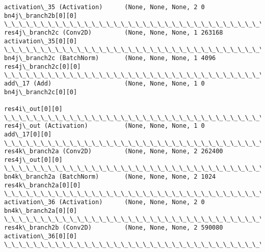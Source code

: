 \documentclass[11pt]{article}
\begin{document}
\begin{Verbatim}[commandchars=\\\{\}]
activation\_35 (Activation)      (None, None, None, 2 0           bn4j\_branch2b[0][0]              
\_\_\_\_\_\_\_\_\_\_\_\_\_\_\_\_\_\_\_\_\_\_\_\_\_\_\_\_\_\_\_\_\_\_\_\_\_\_\_\_\_\_\_\_\_\_\_\_\_\_\_\_\_\_\_\_\_\_\_\_\_\_\_\_\_\_\_\_\_\_\_\_\_\_\_\_\_\_\_\_\_\_\_\_\_\_\_\_\_\_\_\_\_\_\_\_\_\_
res4j\_branch2c (Conv2D)         (None, None, None, 1 263168      activation\_35[0][0]              
\_\_\_\_\_\_\_\_\_\_\_\_\_\_\_\_\_\_\_\_\_\_\_\_\_\_\_\_\_\_\_\_\_\_\_\_\_\_\_\_\_\_\_\_\_\_\_\_\_\_\_\_\_\_\_\_\_\_\_\_\_\_\_\_\_\_\_\_\_\_\_\_\_\_\_\_\_\_\_\_\_\_\_\_\_\_\_\_\_\_\_\_\_\_\_\_\_\_
bn4j\_branch2c (BatchNorm)       (None, None, None, 1 4096        res4j\_branch2c[0][0]             
\_\_\_\_\_\_\_\_\_\_\_\_\_\_\_\_\_\_\_\_\_\_\_\_\_\_\_\_\_\_\_\_\_\_\_\_\_\_\_\_\_\_\_\_\_\_\_\_\_\_\_\_\_\_\_\_\_\_\_\_\_\_\_\_\_\_\_\_\_\_\_\_\_\_\_\_\_\_\_\_\_\_\_\_\_\_\_\_\_\_\_\_\_\_\_\_\_\_
add\_17 (Add)                    (None, None, None, 1 0           bn4j\_branch2c[0][0]              
                                                                 res4i\_out[0][0]                  
\_\_\_\_\_\_\_\_\_\_\_\_\_\_\_\_\_\_\_\_\_\_\_\_\_\_\_\_\_\_\_\_\_\_\_\_\_\_\_\_\_\_\_\_\_\_\_\_\_\_\_\_\_\_\_\_\_\_\_\_\_\_\_\_\_\_\_\_\_\_\_\_\_\_\_\_\_\_\_\_\_\_\_\_\_\_\_\_\_\_\_\_\_\_\_\_\_\_
res4j\_out (Activation)          (None, None, None, 1 0           add\_17[0][0]                     
\_\_\_\_\_\_\_\_\_\_\_\_\_\_\_\_\_\_\_\_\_\_\_\_\_\_\_\_\_\_\_\_\_\_\_\_\_\_\_\_\_\_\_\_\_\_\_\_\_\_\_\_\_\_\_\_\_\_\_\_\_\_\_\_\_\_\_\_\_\_\_\_\_\_\_\_\_\_\_\_\_\_\_\_\_\_\_\_\_\_\_\_\_\_\_\_\_\_
res4k\_branch2a (Conv2D)         (None, None, None, 2 262400      res4j\_out[0][0]                  
\_\_\_\_\_\_\_\_\_\_\_\_\_\_\_\_\_\_\_\_\_\_\_\_\_\_\_\_\_\_\_\_\_\_\_\_\_\_\_\_\_\_\_\_\_\_\_\_\_\_\_\_\_\_\_\_\_\_\_\_\_\_\_\_\_\_\_\_\_\_\_\_\_\_\_\_\_\_\_\_\_\_\_\_\_\_\_\_\_\_\_\_\_\_\_\_\_\_
bn4k\_branch2a (BatchNorm)       (None, None, None, 2 1024        res4k\_branch2a[0][0]             
\_\_\_\_\_\_\_\_\_\_\_\_\_\_\_\_\_\_\_\_\_\_\_\_\_\_\_\_\_\_\_\_\_\_\_\_\_\_\_\_\_\_\_\_\_\_\_\_\_\_\_\_\_\_\_\_\_\_\_\_\_\_\_\_\_\_\_\_\_\_\_\_\_\_\_\_\_\_\_\_\_\_\_\_\_\_\_\_\_\_\_\_\_\_\_\_\_\_
activation\_36 (Activation)      (None, None, None, 2 0           bn4k\_branch2a[0][0]              
\_\_\_\_\_\_\_\_\_\_\_\_\_\_\_\_\_\_\_\_\_\_\_\_\_\_\_\_\_\_\_\_\_\_\_\_\_\_\_\_\_\_\_\_\_\_\_\_\_\_\_\_\_\_\_\_\_\_\_\_\_\_\_\_\_\_\_\_\_\_\_\_\_\_\_\_\_\_\_\_\_\_\_\_\_\_\_\_\_\_\_\_\_\_\_\_\_\_
res4k\_branch2b (Conv2D)         (None, None, None, 2 590080      activation\_36[0][0]              
\_\_\_\_\_\_\_\_\_\_\_\_\_\_\_\_\_\_\_\_\_\_\_\_\_\_\_\_\_\_\_\_\_\_\_\_\_\_\_\_\_\_\_\_\_\_\_\_\_\_\_\_\_\_\_\_\_\_\_\_\_\_\_\_\_\_\_\_\_\_\_\_\_\_\_\_\_\_\_\_\_\_\_\_\_\_\_\_\_\_\_\_\_\_\_\_\_\_

\end{Verbatim}
\end{document}
